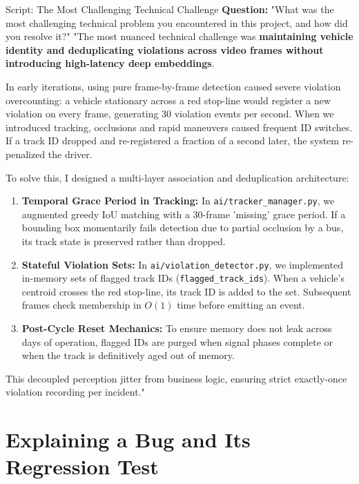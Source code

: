 \begin{interviewq}{Script: The Most Challenging Technical Challenge}
\textbf{Question:} "What was the most challenging technical problem you encountered in this project, and how did you resolve it?"
\tcblower
"The most nuanced technical challenge was \textbf{maintaining vehicle identity and deduplicating violations across video frames without introducing high-latency deep embeddings}.

In early iterations, using pure frame-by-frame detection caused severe violation overcounting: a vehicle stationary across a red stop-line would register a new violation on every frame, generating 30 violation events per second. When we introduced tracking, occlusions and rapid maneuvers caused frequent ID switches. If a track ID dropped and re-registered a fraction of a second later, the system re-penalized the driver.

To solve this, I designed a multi-layer association and deduplication architecture:
\begin{enumerate}
    \item \textbf{Temporal Grace Period in Tracking:} In \texttt{ai/tracker\_manager.py}, we augmented greedy IoU matching with a 30-frame 'missing' grace period. If a bounding box momentarily fails detection due to partial occlusion by a bus, its track state is preserved rather than dropped.
    \item \textbf{Stateful Violation Sets:} In \texttt{ai/violation\_detector.py}, we implemented in-memory sets of flagged track IDs (\texttt{flagged\_track\_ids}). When a vehicle's centroid crosses the red stop-line, its track ID is added to the set. Subsequent frames check membership in $O(1)$ time before emitting an event.
    \item \textbf{Post-Cycle Reset Mechanics:} To ensure memory does not leak across days of operation, flagged IDs are purged when signal phases complete or when the track is definitively aged out of memory.
\end{enumerate}
This decoupled perception jitter from business logic, ensuring strict exactly-once violation recording per incident."
\end{interviewq}

\section{Explaining a Bug and Its Regression Test}
\label{sec:script_bug_regression}

